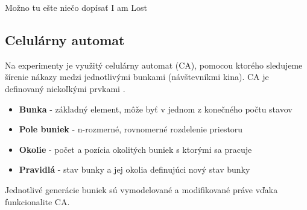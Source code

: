 \documentclass[a4paper, 11pt]{article}
\begin{document}
	Možno tu ešte niečo dopísať I am Lost
	
	    \subsection{Celulárny automat}
        Na experimenty je využitý celulárny automat (CA), pomocou ktorého sledujeme šírenie nákazy medzi jednotlivými bunkami (návštevníkmi kina). CA je definovaný niekoľkými prvkami \cite{petrperingermartinhruby}.	
        \begin{itemize}
            \item \textbf{Bunka} - základný element, môže byť v jednom z konečného počtu stavov
            \item \textbf{Pole buniek} - n-rozmerné, rovnomerné rozdelenie priestoru
            \item \textbf{Okolie} - počet a pozícia okolitých buniek s ktorými sa pracuje
            \item \textbf{Pravidlá} - stav bunky a jej okolia definujúci nový stav bunky
        \end{itemize}
        Jednotlivé generácie buniek sú vymodelované a modifikované práve vďaka funkcionalite CA. 

	\newpage
    
    \renewcommand{\refname}{Bibliografia}
    \label{sec:bib}
    
\end{document}
